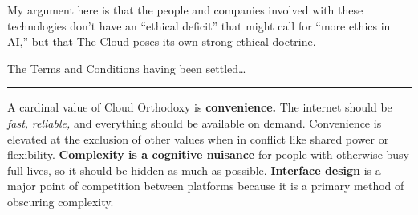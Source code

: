 My argument here is that the people and companies involved with these
technologies don't have an ``ethical deficit'' that might call for
``more ethics in AI,'' but that The Cloud poses its own strong ethical
doctrine.

The Terms and Conditions having been settled\ldots{}

\begin{center}\rule{0.5\linewidth}{0.5pt}\end{center}

A cardinal value of Cloud Orthodoxy is \textbf{convenience.} The
internet should be \emph{fast,} \emph{reliable,} and
everything
should be available on demand. Convenience is elevated at the exclusion
of other values when in conflict like shared power or flexibility.
\textbf{Complexity is a cognitive nuisance} for people with otherwise
busy full lives, so it should be hidden as much as possible.
\textbf{Interface design} is a major point of competition between
platforms because it is a primary method of obscuring complexity.

